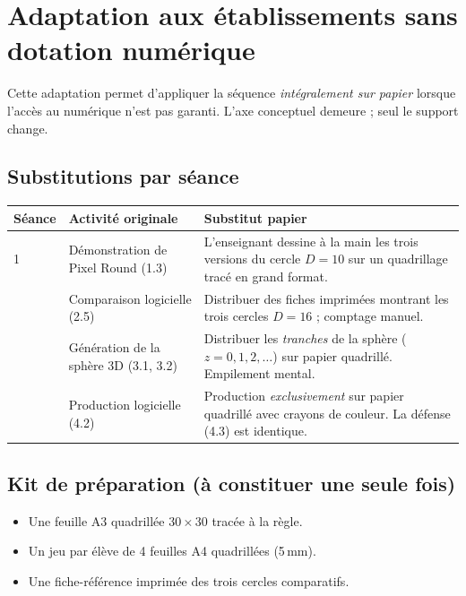 \documentclass[12pt,a4paper]{scrartcl}
\begin{document}
\newpage
\section{Adaptation aux établissements sans dotation numérique}\label{ap:adapt}

Cette adaptation permet d'appliquer la séquence \emph{intégralement sur papier} lorsque l'accès au numérique n'est pas garanti. L'axe conceptuel demeure ; seul le support change.

\subsection{Substitutions par séance}

\begin{center}
\small
\begin{tabularx}{\textwidth}{@{}p{}p{}X@{}}
\toprule
\textbf{Séance} & \textbf{Activité originale} & \textbf{Substitut papier} \\
\midrule
1 & Démonstration de Pixel Round (1.3) & L'enseignant dessine à la main les trois versions du cercle $D = 10$ sur un quadrillage tracé en grand format. \\
\addlinespace[3pt]
2 & Comparaison logicielle (2.5) & Distribuer des fiches imprimées montrant les trois cercles $D = 16$ ; comptage manuel. \\
\addlinespace[3pt]
3 & Génération de la sphère 3D (3.1, 3.2) & Distribuer les \emph{tranches} de la sphère ($z = 0, 1, 2, \ldots$) sur papier quadrillé. Empilement mental. \\
\addlinespace[3pt]
4 & Production logicielle (4.2) & Production \emph{exclusivement} sur papier quadrillé avec crayons de couleur. La défense (4.3) est identique. \\
\bottomrule
\end{tabularx}
\end{center}

\subsection{Kit de préparation (à constituer une seule fois)}
\begin{itemize}[leftmargin=1.3em,itemsep=0.1em,topsep=0.2em,nosep]
  \item Une feuille A3 quadrillée $30 \times 30$ tracée à la règle.
  \item Un jeu par élève de 4 feuilles A4 quadrillées (5\,mm).
  \item Une fiche-référence imprimée des trois cercles comparatifs.
\end{itemize}
\end{document}
